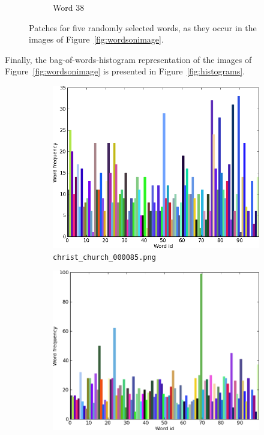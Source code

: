 \documentclass[a4paper,10pt]{article}
\begin{document}
\begin{figure}
\begin{subfigure}{0.49\textwidth}
    \caption{Word 38}
  \end{subfigure}
  \caption{Patches for five randomly selected words, as they occur in the images of Figure~\ref{fig:wordsonimage}.}
  \label{fig:words}
\end{figure}

Finally, the bag-of-words-histogram representation of the images of Figure~\ref{fig:wordsonimage} is presented in Figure~\ref{fig:histograms}.

\begin{figure}
  \begin{subfigure}{0.49\textwidth}
    \centering
    \includegraphics[width=\textwidth,height=.3\textheight,keepaspectratio]{histogram1}
    \caption{\texttt{christ\_church\_000085.png}}
  \end{subfigure}
  \begin{subfigure}{0.49\textwidth}
    \centering
    \includegraphics[width=\textwidth,height=.3\textheight,keepaspectratio]{histogram2}

\end{subfigure}
\end{figure}
\end{document}
